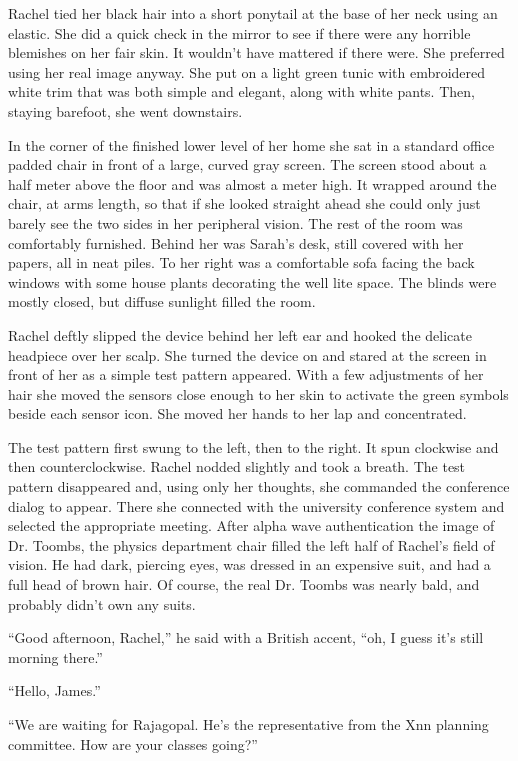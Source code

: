 
\noindent Rachel tied her black hair into a short ponytail at the base of her neck using an
elastic. She did a quick check in the mirror to see if there were any horrible blemishes on her
fair skin. It wouldn't have mattered if there were. She preferred using her real image anyway.
She put on a light green tunic with embroidered white trim that was both simple and elegant,
along with white pants. Then, staying barefoot, she went downstairs.

In the corner of the finished lower level of her home she sat in a standard office padded chair
in front of a large, curved gray screen. The screen stood about a half meter above the floor and
was almost a meter high. It wrapped around the chair, at arms length, so that if she looked
straight ahead she could only just barely see the two sides in her peripheral vision. The rest
of the room was comfortably furnished. Behind her was Sarah's desk, still covered with her
papers, all in neat piles. To her right was a comfortable sofa facing the back windows with some
house plants decorating the well lite space. The blinds were mostly closed, but diffuse sunlight
filled the room.

Rachel deftly slipped the device behind her left ear and hooked the delicate headpiece over her
scalp. She turned the device on and stared at the screen in front of her as a simple test
pattern appeared. With a few adjustments of her hair she moved the sensors close enough to her
skin to activate the green symbols beside each sensor icon. She moved her hands to her lap and
concentrated.

The test pattern first swung to the left, then to the right. It spun clockwise and then
counterclockwise. Rachel nodded slightly and took a breath. The test pattern disappeared and,
using only her thoughts, she commanded the conference dialog to appear. There she connected with
the university conference system and selected the appropriate meeting. After alpha wave
authentication the image of Dr. Toombs, the physics department chair filled the left half of
Rachel's field of vision. He had dark, piercing eyes, was dressed in an expensive suit, and had
a full head of brown hair. Of course, the real Dr. Toombs was nearly bald, and probably didn't
own any suits.

``Good afternoon, Rachel,'' he said with a British accent, ``oh, I guess it's still morning
there.''

``Hello, James.''

``We are waiting for Rajagopal. He's the representative from the Xnn planning committee. How are
your classes going?''

